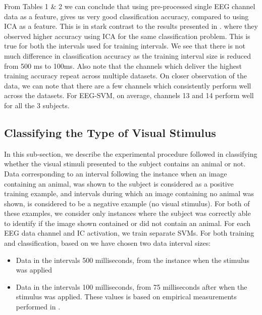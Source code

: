 \documentclass{article} %
\begin{document}
\begin{table}[t]
\begin{center}
\begin{tabular}{c|c|cc|cc}
		\end{tabular}
	\end{center}
\end{table}

From Tables 1 \& 2 we can conclude that using pre-processed single EEG channel data as a feature, gives us very good classification accuracy, compared to using ICA as a feature. This is in stark contrast to the results presented in \cite{Stewart20141}. where they observed higher accuracy using ICA for the same classification problem. This is true for both the intervals used for training intervals. We see that there is not much difference in classification accuracy as the training interval size is reduced from 500 ms to 100ms. Also note that the channels which deliver the highest training accuracy repeat across multiple datasets. On closer observation of the data, we can note that there are a few channels which consistently perform well across the datasets. For EEG-SVM, on average, channels 13 and 14 perform well for all the 3 subjects.

\subsection{Classifying the Type of Visual Stimulus}
In this sub-section, we describe the experimental procedure followed in classifying whether the visual stimuli presented to the subject contains an animal or not. Data corresponding to an interval following the instance when an image containing an animal, was shown to the subject is considered as a positive training example, and intervals during which an image containing no animal was shown, is considered to be a negative example (no visual stimulus). For both of these examples, we consider only instances where the subject was correctly able to identify if the image shown contained or did not contain an animal. For each EEG data channel and IC activation, we train separate SVMs. For both training and classification, based on \cite{Stewart20141} we have chosen two data interval sizes:

\begin{itemize}
	\item Data in the intervals 500 milliseconds, from the instance when the stimulus was applied
	\item Data in the intervals 100 milliseconds, from 75 milliseconds after when the stimulus was applied. These values is based on empirical measurements performed in \cite{Stewart20141}.
\end{itemize}
\end{document}

